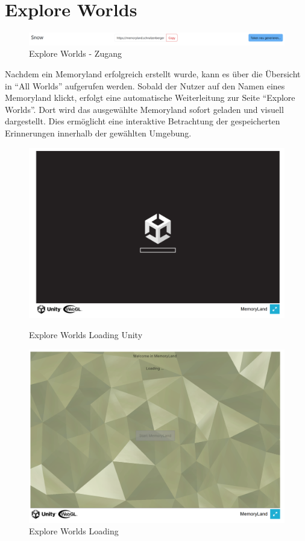 \section{Explore Worlds}


\begin{figure} [h t]
    \centering
    \includegraphics[scale=0.45]{pics/explore_worlds_header.PNG}
    \caption{Explore Worlds - Zugang}
    \label{fig:explore-worlds-overview}
\end{figure}

Nachdem ein Memoryland erfolgreich erstellt wurde, kann es über die Übersicht in ``All Worlds'' aufgerufen werden. 
Sobald der Nutzer auf den Namen eines Memoryland klickt, erfolgt eine automatische Weiterleitung 
zur Seite ``Explore Worlds''. Dort wird das ausgewählte Memoryland sofort geladen 
und visuell dargestellt. Dies ermöglicht eine interaktive Betrachtung der gespeicherten 
Erinnerungen innerhalb der gewählten Umgebung.


\begin{figure} [h t]
    \centering
    \includegraphics[scale=0.5]{pics/explore_worlds_loading_unity.PNG}
    \caption{Explore Worlds Loading Unity}
    \label{fig:explore-worlds-loading-unity}

    \centering
    \includegraphics[scale=0.5]{pics/explore_worlds_loading.PNG}
    \caption{Explore Worlds Loading}
    \label{fig:explore-worlds-loading}
\end{figure}

